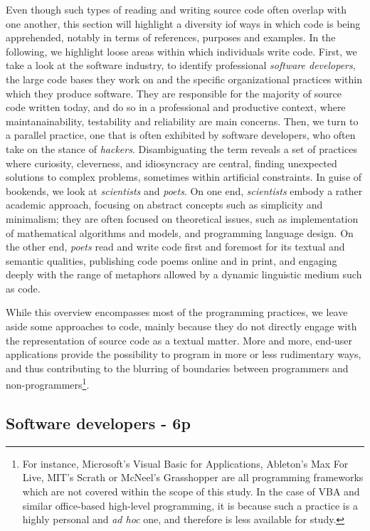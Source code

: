 Even though such types of reading and writing source code often overlap with one another, this section will highlight a diversity iof ways in which code is being apprehended, notably in terms of references, purposes and examples. In the following, we highlight loose areas within which individuals write code. First, we take a look at the software industry, to identify professional \emph{software developers}, the large code bases they work on and the specific organizational practices within which they produce software. They are responsible for the majority of source code written today, and do so in a professional and productive context, where maintanainability, testability and reliability are main concerns. Then, we turn to a parallel practice, one that is often exhibited by software developers, who often take on the stance of \emph{hackers}. Disambiguating the term reveals a set of practices where curiosity, cleverness, and idiosyncracy are central, finding unexpected solutions to complex problems, sometimes within artificial constraints. In guise of bookends, we look at \emph{scientists} and \emph{poets}. On one end, \emph{scientists} embody a rather academic approach,  focusing on abstract concepts such as simplicity and minimalism; they are often focused on theoretical issues, such as implementation of mathematical algorithms and models, and programming language design. On the other end, \emph{poets} read and write code first and foremost for its textual and semantic qualities, publishing code poems online and in print, and engaging deeply with the range of metaphors allowed by a dynamic linguistic medium such as code.

While this overview encompasses most of the programming practices, we leave aside some approaches to code, mainly because they do not directly engage with the representation of source code as a textual matter. More and more, end-user applications provide the possibility to program in more or less rudimentary ways, and thus contributing to the blurring of boundaries between programmers and non-programmers\footnote{For instance, Microsoft's Visual Basic for Applications, Ableton's Max For Live, MIT's Scrath or McNeel's Grasshopper are all programming frameworks which are not covered within the scope of this study. In the case of VBA and similar office-based high-level programming, it is because such a practice is a highly personal and \emph{ad hoc} one, and therefore is less available for study.}.

\subsection{Software developers - 6p}

